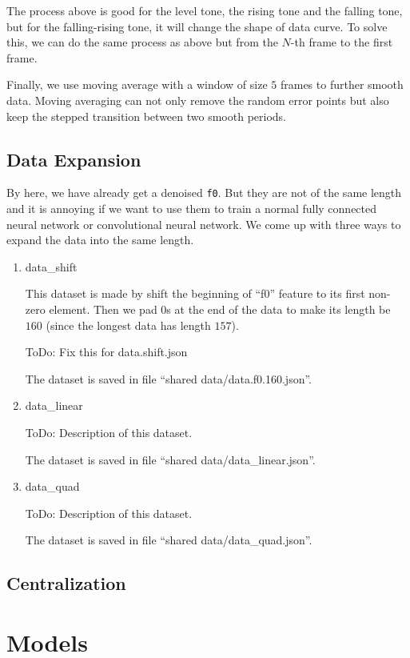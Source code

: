 \documentclass[a4paper]{article}
\begin{document}
The process above is good for the level tone, the rising tone and the falling tone, but for the falling-rising tone, it will change the shape of data curve. To solve this, we can do the same process as above but from the $N$-th frame to the first frame.

Finally, we use moving average with a window of size $5$ frames to further smooth data. Moving averaging can not only remove the random error points but also keep the stepped transition between two smooth periods.

\subsection{Data Expansion}
By here, we have already get a denoised \texttt{f0}. But they are not of the same length and it is annoying if we want to use them to train a normal fully connected neural network or convolutional neural network. We come up with three ways to expand the data into the same length.
\begin{enumerate}
\item data\_shift

	This dataset is made by shift the beginning of ``f0'' feature to its first non-zero element. Then we pad $0$s at the end of the data to make its length be $160$ (since the longest data has length $157$).

	ToDo: Fix this for data.shift.json

	The dataset is saved in file ``shared data/data.f0.160.json''.
\item data\_linear

	ToDo: Description of this dataset.

	The dataset is saved in file ``shared data/data\_linear.json''.

\item data\_quad
	
	ToDo: Description of this dataset.

	The dataset is saved in file ``shared data/data\_quad.json''.

\end{enumerate}

\subsection{Centralization}

\section{Models}
\end{document}
